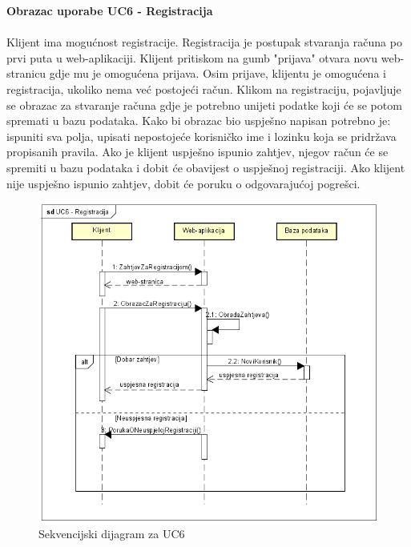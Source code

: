 \noindent\textbf{Obrazac uporabe UC6 - Registracija}\\\\
Klijent ima mogućnost registracije. Registracija je postupak stvaranja računa po prvi puta u web-aplikaciji.
Klijent pritiskom na gumb "prijava" otvara novu web-stranicu gdje mu je omogućena prijava.
Osim prijave, klijentu je omogućena i registracija, ukoliko nema već postojeći račun.
Klikom na registraciju, pojavljuje se obrazac za stvaranje računa gdje je potrebno unijeti podatke koji će se potom spremati u bazu podataka.
Kako bi obrazac bio uspješno napisan potrebno je: ispuniti sva polja, upisati nepostojeće korisničko ime i lozinku koja se pridržava propisanih pravila.
Ako je klijent uspješno ispunio zahtjev, njegov račun će se spremiti u bazu podataka i dobit će obavijest o uspješnoj registraciji.
Ako klijent nije uspješno ispunio zahtjev, dobit će poruku o odgovarajućoj pogrešci.
\begin{figure}[H]
	\includegraphics[scale=1.0]{slike/Slika8.png} %
	\centering
	\caption{Sekvencijski dijagram za UC6}
	\label{fig:promjene}
\end{figure}
\pagebreak

